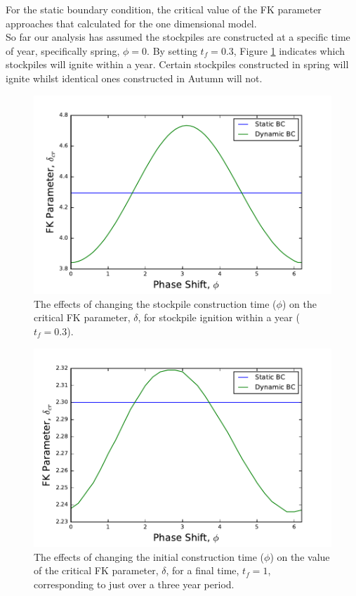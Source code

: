 For the static boundary condition, the critical value of the FK parameter approaches that calculated for the one dimensional model. \\
So far our analysis has assumed the stockpiles are constructed at a specific time of year, specifically spring, $\phi=0$. By setting $t_f=0.3$, Figure \ref{phi} indicates which stockpiles will ignite within a year. Certain stockpiles constructed in spring will ignite whilst identical ones constructed in Autumn will not.\\ 
\begin{figure}[h!]
\centering
\includegraphics[scale=0.8]{figures/NDA/PBC/phaseshift.pdf} 
\caption{The effects of changing the stockpile construction time ($\phi$) on the critical FK parameter, $\delta$, for stockpile ignition within a year ($t_f=0.3$).}
\label{phi}
\end{figure}
\begin{figure}[h!]
\centering
\includegraphics[scale=0.8]{figures/NDA/PBC/phaseshift2.pdf} 
\caption{The effects of changing the initial construction time ($\phi$) on the value of the critical FK parameter, $\delta$, for a final time, $t_f=1$, corresponding to just over a three year period.}
\label{phi2}
\end{figure}
